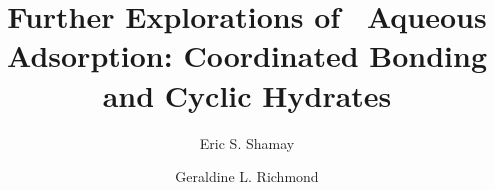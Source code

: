 \documentclass{article}
\title{Further Explorations of \suldiox~Aqueous Adsorption: Coordinated Bonding and Cyclic Hydrates}
\author{Eric S. Shamay \and Geraldine L. Richmond}
\begin{document}
\newcommand{\suldiox}{SO$_2$}
\newcommand{\ang}{\,$\textrm{\AA}$}
\newcommand{\angs}{\ang}
\newcommand{\wat}{H$_2$O}


\doublespacing











\end{document}
